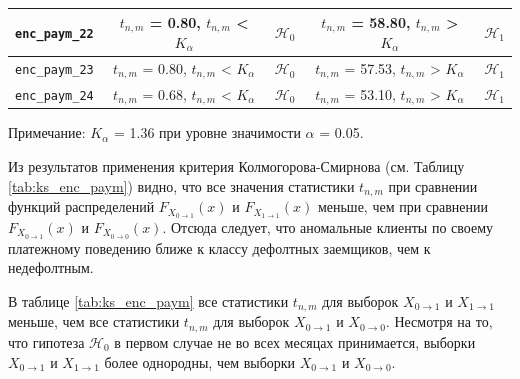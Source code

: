 \begin{table}[H]
\begin{tabular}{|c|c|c|c|c|}
		\texttt{enc\_paym\_22} & $t_{n,m}$ = 0.80, $t_{n,m}$ < $K_\alpha$ & $\mathcal{H}_0$  & $t_{n,m}$ = 58.80, $t_{n,m}$ > $K_\alpha$ & $\mathcal{H}_1$ \\ \hline
		\texttt{enc\_paym\_23} & $t_{n,m}$ = 0.80, $t_{n,m}$ < $K_\alpha$ & $\mathcal{H}_0$  & $t_{n,m}$ = 57.53, $t_{n,m}$ > $K_\alpha$ & $\mathcal{H}_1$ \\ \hline
		\texttt{enc\_paym\_24} & $t_{n,m}$ = 0.68, $t_{n,m}$ < $K_\alpha$ & $\mathcal{H}_0$  & $t_{n,m}$ = 53.10, $t_{n,m}$ > $K_\alpha$ & $\mathcal{H}_1$ \\ \hline
	\end{tabular}
	
	\vspace{3mm} 
	
	\begin{minipage}{0.98\textwidth}
		\fontsize{9}{11}\selectfont
		\justifying
		Примечание: $K_\alpha$ = 1.36 при уровне значимости $\alpha$ = 0.05.
	\end{minipage}
\end{table}

Из результатов применения критерия Колмогорова-Смирнова (см. Таблицу \ref{tab:ks_enc_paym}) видно, что все значения статистики  $t_{n,m}$ при сравнении функций распределений $F_{X_{0 \to 1}}(x)$ и $F_{X_{1 \to 1}}(x)$ меньше, чем при сравнении $F_{X_{0 \to 1}}(x)$ и $F_{X_{0 \to 0}}(x)$. Отсюда следует, что аномальные клиенты по своему платежному поведению ближе к классу дефолтных заемщиков, чем к недефолтным.

\begin{notice}
	В таблице \ref{tab:ks_enc_paym} все статистики $t_{n,m}$ для выборок $X_{0 \to 1}$ и $X_{1 \to 1}$ меньше, чем все статистики $t_{n,m}$ для выборок $X_{0 \to 1}$ и $X_{0 \to 0}$. Несмотря на то, что гипотеза $\mathcal{H}_0$ в первом случае не во всех месяцах принимается, выборки $X_{0 \to 1}$ и $X_{1 \to 1}$ более однородны, чем выборки $X_{0 \to 1}$ и $X_{0 \to 0}$.
\end{notice}




